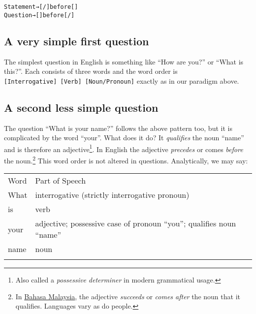 \documentclass[
  11pt,
  british,
  a4paper,
]{article}
\let\addlinespace\relax
\let\toprule\relax
\let\bottomrule\relax
\let\midrule\relax
\let\addlinespace\relax
\begin{document}
\begin{tcolorbox}
\begin{alltt}
\color{normal}
Statement → [/] before []
Question  → [] before [/]
\end{alltt}
\end{tcolorbox}

\hypertarget{a-very-simple-first-question}{%
\subsection{A very simple first
question}\label{a-very-simple-first-question}}

The simplest question in English is something like ``How are you?'' or
``What is this?''. Each consists of three words and the word order is
\texttt{{[}Interrogative{]}\ {[}Verb{]}\ {[}Noun/Pronoun{]}} exactly as
in our paradigm above.

\hypertarget{a-second-less-simple-question}{%
\subsection{A second less simple
question}\label{a-second-less-simple-question}}

The question ``What is your name?'' follows the above pattern too, but
it is complicated by the word ``your''. What does it do? It
\emph{qualifies} the noun ``name'' and is therefore an
adjective\footnote{Also called a \emph{possessive determiner} in modern
  grammatical usage.}. In English the adjective \emph{precedes} or comes
\emph{before} the noun.\footnote{In
  \href{http://en.wikipedia.org/wiki/Bahasa_Malaysia}{Bahasa Malaysia},
  the adjective \emph{succeeds} or \emph{comes after} the noun that it
  qualifies. Languages vary as do people.} This word order is not
altered in questions. Analytically, we may say:

\begin{longtable}[]{@{}ll@{}}
\toprule
Word & Part of Speech \\ \addlinespace
\midrule
\endhead
What & interrogative (strictly interrogative pronoun) \\ \addlinespace
is & verb \\ \addlinespace
your & adjective; possessive case of pronoun ``you''; qualifies noun
``name'' \\ \addlinespace
name & noun \\ \addlinespace
\bottomrule
\end{longtable}
\end{document}

